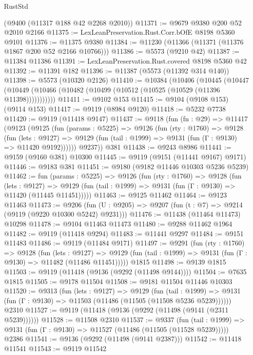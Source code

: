 \begin{lexlean}{RustStd}
\begin{coremodule}
    (@9400 (@11317 @188 @42 @2268 @2010))
@11371 := @9679 @9380 @200 @52 @2010 @2166
@11375 := LexLeanPreservation.Rust.Corr.bOfE @8198 @5360 @9101
@11376 := @11375 @9380
@11384 := @11230 (@11366 (@11371 (@11376 @1867 @200 @52 @2166 @10766)))
@11386 := @5573 (@9210 @42)
@11387 := @11384 @11386
@11391 := LexLeanPreservation.Rust.covered @8198 @5360 @42
@11392 := @11391 @182
@11396 := @11387 (@5573 (@11392 @314 @140))
@11398 := @5573 (@10320 @2126)
@11410 := @10384
    (@10406
      (@10445
        (@10447 (@10449 (@10466 (@10482 (@10499 (@10512 (@10525 (@10529 (@11396 @11398)))))))))))
@11411 := @9102 @153
@11415 := @9104 (@9108 @153) (@9114 @153)
@11417 := @9119 (@8984 @9120)
@11418 := @5232 @7738
@11420 := @9119 (@11418 @9147)
@11437 := @9118
    (fun (fn : @29) =>
    @11417
      (@9123
        (@9125
          (fun (params : @5225) =>
          @9126
            (fun (rty : @1760) =>
            @9128
              (fun (lets : @9127) =>
              @9129 (fun (tail : @1999) => @9131 (fun (Γ : @9130) => @11420 @9192))))))
        @9237))
    @381
@11438 := @9243 @8986
@11441 := @9159 (@9160 @381) @10300
@11445 := @9119 (@9151 (@11441 @9167) @9171)
@11446 := @9183 @381
@11451 := @9180 (@9182 @11446 @10303 @5236 @5239)
@11462 := fun (params : @5225) =>
  @9126
    (fun (rty : @1760) =>
    @9128
      (fun (lets : @9127) =>
      @9129 (fun (tail : @1999) => @9131 (fun (Γ : @9130) => @11420 (@11445 @11451)))))
@11463 := @9125 @11462
@11464 := @9123 @11463
@11473 := @9206
    (fun (U : @9205) => @9207 (fun (t : @7) => @9214 (@9119 (@9220 @10300 @5242) @9231)))
@11476 := @11438 (@11464 @11473) @10298
@11478 := @9104 @11463 @11473
@11480 := @9288 @11462 @1964
@11482 := @9119 (@11418 @9294)
@11483 := @11441 @9297
@11484 := @9151 @11483
@11486 := @9119 (@11484 @9171)
@11497 := @9291
    (fun (rty : @1760) =>
    @9128
      (fun (lets : @9127) =>
      @9129 (fun (tail : @1999) => @9131 (fun (Γ : @9130) => @11482 (@11486 @11451)))))
    @1815
@11498 := @9139 @1815
@11503 := @9119 (@11418 (@9136 (@9292 (@11498 @9144))))
@11504 := @7635 @1815
@11505 := @9178 @11504
@11508 := @9181 @11504 @11446 @10303
@11520 := @9313
    (fun (lets : @9127) =>
    @9129
      (fun (tail : @1999) =>
      @9131 (fun (Γ : @9130) => @11503 (@11486 (@11505 (@11508 @5236 @5239))))))
    @2310
@11527 := @9119 (@11418 (@9136 (@9292 (@11498 (@9141 (@2311 @5239))))))
@11528 := @11508 @2310
@11537 := @9337
    (fun (tail : @1999) => @9131 (fun (Γ : @9130) => @11527 (@11486 (@11505 (@11528 @5239)))))
    @2386
@11541 := @9136 (@9292 (@11498 (@9141 @2387)))
@11542 := @11418 @11541
@11543 := @9119 @11542

\end{coremodule}
\end{lexlean}
